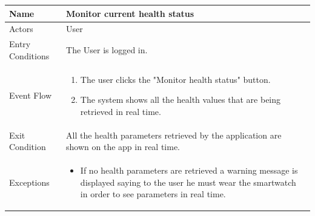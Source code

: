 \begin{enumerate}
\FloatBarrier
\begin{table}[h]
\begin{tabular}{|l|p{}|}
\hline
Name             & Monitor current health status \\ \hline
Actors           & User  \\ \hline
Entry Conditions & The User is logged in. \\ \hline
Event Flow       & \begin{enumerate}
            \item The user clicks the "Monitor health status" button.
            \item The system shows all the health values that are being retrieved in real time.
        \end{enumerate}\\ \hline
Exit Condition   & All the health parameters retrieved by the application are shown on the app in real time.\\ \hline
Exceptions       & \begin{itemize}
\item If no health parameters are retrieved a warning message is displayed saying to the user he must wear the smartwatch in order to see parameters in real time. 
\end{itemize}\\ \hline
\end{tabular}
\end{table}
\FloatBarrier


\end{enumerate}
